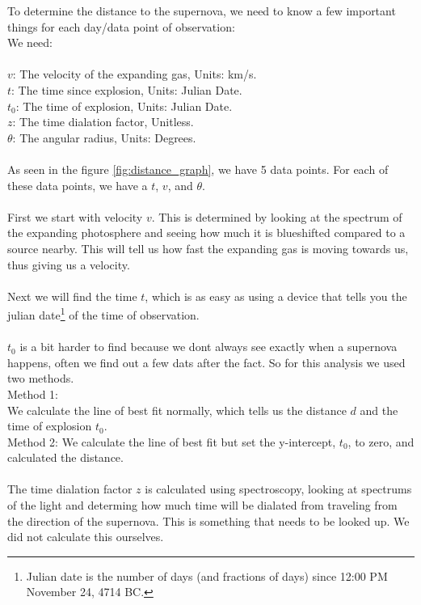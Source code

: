 To determine the distance to the supernova, we need to know a 
few important things for each day/data point of observation:
\\
We need:
\\
\\
$v$: The velocity of the expanding gas, Units: km/s.
\\
$t$: The time since explosion, Units: Julian Date.
\\
$t_0$: The time of explosion, Units: Julian Date.
\\
$z$: The time dialation factor, Unitless.
\\
$\theta$: The angular radius, Units: Degrees.
\\
\\
As seen in the figure \ref{fig:distance_graph}, we have 5 data points. 
For each of these data points, we have a $t$, $v$, and $\theta$.
\\
\\
First we start with velocity $v$. This is determined by looking at 
the spectrum of the expanding photosphere and seeing how much it is blueshifted compared to 
a source nearby. This will tell us how fast the expanding gas is moving towards us, thus 
giving us a velocity.
\\
\\
Next we will find the time $t$, which is as easy as using a device that tells you the 
julian date\footnote{Julian date is the number of days (and fractions of days) 
since 12:00 PM November 24, 4714 BC.} of the time of observation. 
\\
\\
$t_0$ is a bit harder to find because we dont always see exactly when a supernova 
happens, often we find out a few dats after the fact. So for this analysis we used two methods.
\\
Method 1: 
\\
We calculate the line of best fit normally, which tells us the distance $d$ and the time of explosion $t_0$.
\\
Method 2: 
We calculate the line of best fit but set the y-intercept, $t_0$, to zero, and calculated the distance.
\\
\\
The time dialation factor $z$ is calculated using spectroscopy, looking at spectrums of the light and determing 
how much time will be dialated from traveling from the direction of the supernova. This is something that needs 
to be looked up. We did not calculate this ourselves.
\\
